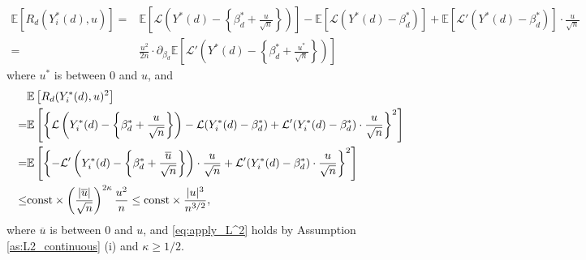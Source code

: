 \documentclass[11pt]{article}
\numberwithin{equation}{section}
\begin{document}
\begin{align*}
	\mathbb{E}\left[R_d(Y^*_i(d),u)\right]=&\mathbb{E}\left[\mathcal{L}\left(Y^*(d)-\left\{\beta_d^*+\frac{u}{\sqrt{n}}\right\}\right)\right]-\mathbb{E}\left[\mathcal{L}(Y^*(d)-\beta_d^*)\right]+\mathbb{E}[\mathcal{L}'(Y^*(d)-\beta_d^*)]\cdot \frac{u}{\sqrt{n}}\\
	=&\frac{u^2}{2n}\cdot \partial_{\beta_d}\mathbb{E}\left[\mathcal{L}'\left(Y^*(d)-\left\{\beta_d^*+\frac{u^*}{\sqrt{n}}\right\}\right)\right]
\end{align*}
where $u^*$ is between $0$ and $u$, and
\begin{align}
	&\mathbb{E}\left[R_d(Y^*_i(d),u)^2\right]\notag\\
	=&\mathbb{E}\left[\left\{\mathcal{L}\left(Y^*_i(d)-\left\{\beta_d^*+\frac{u}{\sqrt{n}}\right\}\right)-\mathcal{L}(Y^*_i(d)-\beta_d^*)+\mathcal{L}'(Y^*_i(d)-\beta_d^*)\cdot \frac{u}{\sqrt{n}}\right\}^2\right] \notag\\
	=& \mathbb{E}\left[\left\{-\mathcal{L}'\left(Y^*_i(d)-\left\{\beta_d^*+\frac{\overline{u}}{\sqrt{n}}\right\}\right)\cdot \frac{u}{\sqrt{n}} +\mathcal{L}'(Y^*_i(d)-\beta_d^*)\cdot \frac{u}{\sqrt{n}}\right\}^2\right]\notag\\
	\leq & \text{const}\times \left(\frac{|\overline{u}|}{\sqrt{n}}\right)^{2\kappa} \frac{u^2}{n} \leq \text{const}\times  \frac{|u|^3}{n^{3/2}}, \label{eq:apply_L^2}
\end{align}
where $\overline{u}$ is between $0$ and $u$, and \eqref{eq:apply_L^2} holds by Assumption \ref{as:L2_continuous} (i) and $\kappa\geq 1/2$.
\end{document}
